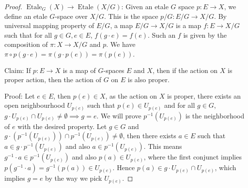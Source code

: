 \documentclass[a4paper]{article}
\DeclareMathOperator{\Et}{\text {Etale}}
\begin{document}
\begin{proof}
    $\Et_G(X)\to \Et(X/G)$: Given an etale $G$ space $p: E\to X$, we define an etale $G$-space over $X/G$. This is the space $p/G:E/G\to X/G$. By universal mapping property of $E/G$, a map $E/G\to X/G$ is a map $f:E\to X/G$ such that for all $g\in G,e\in E$, $f(g\cdot e) = f(e)$. Such an $f$ is given by the composition of $\pi:X\to X/G$ and $p$. We have $\pi\circ p(g\cdot e)=\pi(g\cdot p(e))=\pi(p(e))$. 
    


    Claim: If $p:E\to X$ is a map of $G$-spaces $E$ and $X$, then if the action on $X$ is proper action, then the action of $G$ on $E$ is also proper.

    Proof: Let $e\in E$, then $p(e)\in X$, as the action on $X$ is proper, there exists an open neighbourhood $U_{p(e)}$ such that $p(e)\in U_{p(e)}$ and for all $g\in G$, $g\cdot U_{p(e)}\cap U_{p(e)}\ne \emptyset \implies g = e$. We will prove $p^{-1}(U_{p(e)})$ is the neighborhood of $e$ with the desired property. Let $g\in G$ and $g\cdot (p^{-1}(U_{p(e)}))\cap p^{-1}(U_{p(e)})\ne \emptyset$, then there exists $a\in E$ such that $a\in g\cdot p^{-1}(U_{p(e)})$ and also $a\in p^{-1}(U_{p(e)})$. This means $g^{-1}\cdot a\in p^{-1}(U_{p(e)})$ and also $p(a)\in U_{p(e)}$, where the first conjunct implies $p(g^{-1}\cdot a)=g^{-1}(p(a))\in U_{p(e)}$. Hence $p(a)\in g\cdot U_{p(e)}\cap U_{p(e)}$, which implies $g=e$ by the way we pick $U_{p(e)}$.


\end{proof}
\end{document}
